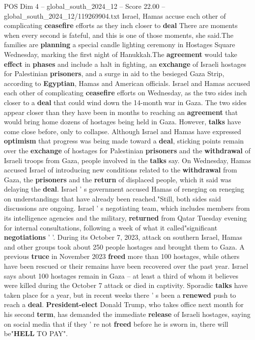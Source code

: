 \begin{textsample}{POS Dim 4 – global\_south\_2024\_12 – Score 22.00 – global\_south\_2024\_12/119269904.txt}  \label{ex:f4_pos_234}
Israel, Hamas accuse each other of complicating \textbf{ceasefire} efforts as they inch closer to \textbf{deal} There are moments when every second is fateful, and this is one of those moments, she said.The families are \textbf{planning} a special candle lighting ceremony in Hostages Square Wednesday, marking the first night of Hanukkah.The \textbf{agreement} would take \textbf{effect} in \textbf{phases} and include a halt in fighting, an \textbf{exchange} of Israeli hostages for Palestinian \textbf{prisoners}, and a surge in aid to the besieged Gaza Strip, according to \textbf{Egyptian}, Hamas and American officials.
Israel and Hamas accused each other of complicating \textbf{ceasefire} efforts on Wednesday, as the two sides inch closer to a \textbf{deal} that could wind down the 14-month war in Gaza.
The two sides appear closer than they have been in months to reaching an \textbf{agreement} that would bring home dozens of hostages being held in Gaza.
However, \textbf{talks} have come close before, only to collapse.
Although Israel and Hamas have expressed \textbf{optimism} that progress was being made toward a \textbf{deal}, sticking points remain over the \textbf{exchange} of hostages for Palestinian \textbf{prisoners} and the \textbf{withdrawal} of Israeli troops from Gaza, people involved in the \textbf{talks} say.
On Wednesday, Hamas accused Israel of introducing new conditions related to the \textbf{withdrawal} from Gaza, the \textbf{prisoners} and the \textbf{return} of displaced people, which it said was delaying the \textbf{deal}.
Israel ' s government accused Hamas of reneging on reneging on understandings that have already been reached."Still, both sides said discussions are ongoing.
Israel ' s negotiating team, which includes members from its intelligence agencies and the military, \textbf{returned} from Qatar Tuesday evening for internal consultations, following a week of what it called"significant \textbf{negotiations} ' '.
During its October 7, 2023, attack on southern Israel, Hamas and other groups took about 250 people hostages and brought them to Gaza.
A previous \textbf{truce} in November 2023 \textbf{freed} more than 100 hostages, while others have been rescued or their remains have been recovered over the past year.
Israel says about 100 hostages remain in Gaza -- at least a third of whom it believes were killed during the October 7 attack or died in captivity.
Sporadic \textbf{talks} have taken place for a year, but in recent weeks there ' s been a \textbf{renewed} push to reach a \textbf{deal}. \textbf{President-elect} Donald Trump, who takes office next month for his second \textbf{term}, has demanded the immediate \textbf{release} of Israeli hostages, saying on social media that if they ' re not \textbf{freed} before he is sworn in, there will be"\textbf{HELL} TO PAY".

\end{textsample}
